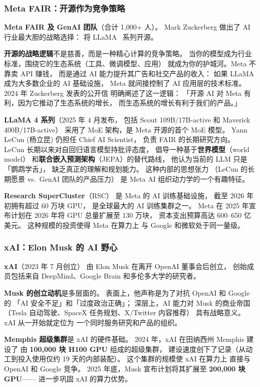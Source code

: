 \subsubsection{Meta FAIR：开源作为竞争策略}

\textbf{Meta FAIR 及 GenAI 团队}（合计 1,000+ 人）。
Mark Zuckerberg 做出了 AI 行业最大胆的战略选择：
将 LLaMA~\cite{touvron2023llama,dubey2024llama3} 系列开源。

\textbf{开源的战略逻辑}不是慈善，而是一种精心计算的竞争策略。
当你的模型成为行业标准，围绕它的生态系统（工具、微调模型、应用）
就成为你的护城河。Meta 不靠卖 API 赚钱，
而是通过 AI 能力提升其广告和社交产品的收入：
如果 LLaMA 成为大多数企业的 AI 基础设施，
Meta 就间接控制了 AI 应用层的技术标准。
2024 年 Zuckerberg 发表的公开信
明确阐述了这一逻辑：
「开源 AI 对 Meta 有利，因为它推动了生态系统的增长，
而生态系统的增长有利于我们的产品。」

\textbf{LLaMA 4 系列}（2025 年 4 月发布，
包括 Scout 109B/17B-active 和 Maverick 400B/17B-active）
采用了 MoE 架构，是 Meta 开源的首个 MoE 模型。
Yann LeCun (杨立昆) 仍担任 Chief AI Scientist，
负责 FAIR 的长期研究方向。
LeCun 长期以来对自回归语言模型持批评态度，
倡导一种基于\textbf{世界模型}（world model）
和\textbf{联合嵌入预测架构}（JEPA）的替代路线，
他认为当前的 LLM 只是「鹦鹉学舌」，
缺乏真正的理解和规划能力。
这种内部的思想张力
（LeCun 的长期愿景 vs.\ GenAI 团队的产品压力）
是 Meta AI 组织动力学的一个有趣特征。

\textbf{Research SuperCluster}（RSC）
是 Meta 的 AI 训练基础设施，
截至 2026 年初拥有超过 60 万块 GPU，
是全球最大的 AI 训练集群之一。
Meta 在 2025 年宣布计划在 2026 年将
GPU 总量扩展至 130 万块，
资本支出预算高达 600--650 亿美元。
这种规模的投资使得 Meta 在算力上
与 Google 和微软处于同一量级。

\subsubsection{xAI：Elon Musk 的 AI 野心}

\textbf{xAI}（2023 年 7 月创立）
由 Elon Musk 在离开 OpenAI 董事会后创立，
创始成员包括来自 DeepMind、Google Brain
和多伦多大学的研究者。

\textbf{Musk 的创立动机}是多层面的。
表面上，他声称是为了对抗 OpenAI 和 Google 的
「AI 安全不足」和「过度政治正确」；
深层上，AI 能力对 Musk 的商业帝国
（Tesla 自动驾驶、SpaceX 任务规划、X/Twitter 内容推荐）
具有战略意义。
xAI 从一开始就定位为
一个同时服务研究和产品的组织。

\textbf{Memphis 超级集群}是 xAI 的硬件基础。
2024 年，xAI 在田纳西州 Memphis 建设了
由 \textbf{100,000 块 H100 GPU} 组成的超级集群，
建设速度创下了记录（从动工到投入使用仅约 19 天的内部装配）。
这个集群的规模使 xAI 在算力上
直接与 OpenAI 和 Google 竞争。
2025 年底，Musk 宣布计划将其扩展至
\textbf{200,000 块 GPU}——
进一步巩固 xAI 的算力优势。

